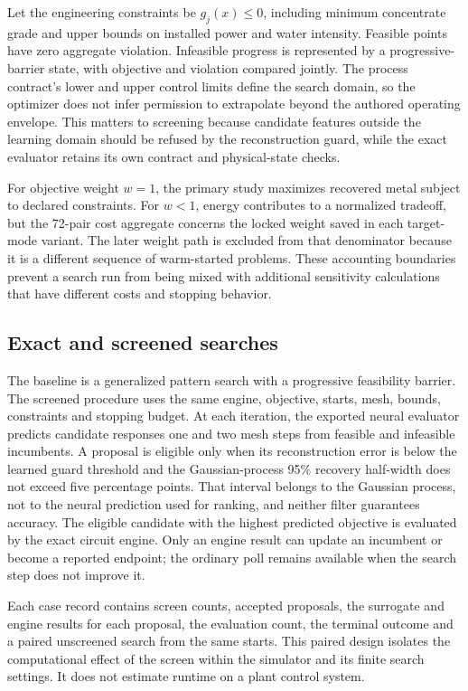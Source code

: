 \documentclass[10pt]{article}
\begin{document}
Let the engineering constraints be $g_j(x)\leq 0$, including minimum concentrate grade and upper bounds on installed power and water intensity. Feasible points have zero aggregate violation. Infeasible progress is represented by a progressive-barrier state, with objective and violation compared jointly. The process contract's lower and upper control limits define the search domain, so the optimizer does not infer permission to extrapolate beyond the authored operating envelope. This matters to screening because candidate features outside the learning domain should be refused by the reconstruction guard, while the exact evaluator retains its own contract and physical-state checks.

For objective weight $w=1$, the primary study maximizes recovered metal subject to declared constraints. For $w<1$, energy contributes to a normalized tradeoff, but the 72-pair cost aggregate concerns the locked weight saved in each target-mode variant. The later weight path is excluded from that denominator because it is a different sequence of warm-started problems. These accounting boundaries prevent a search run from being mixed with additional sensitivity calculations that have different costs and stopping behavior.

\subsection{Exact and screened searches}\label{proposed-screen-method}
The baseline is a generalized pattern search with a progressive feasibility barrier. The screened procedure uses the same engine, objective, starts, mesh, bounds, constraints and stopping budget. At each iteration, the exported neural evaluator predicts candidate responses one and two mesh steps from feasible and infeasible incumbents. A proposal is eligible only when its reconstruction error is below the learned guard threshold and the Gaussian-process 95\% recovery half-width does not exceed five percentage points. That interval belongs to the Gaussian process, not to the neural prediction used for ranking, and neither filter guarantees accuracy. The eligible candidate with the highest predicted objective is evaluated by the exact circuit engine. Only an engine result can update an incumbent or become a reported endpoint; the ordinary poll remains available when the search step does not improve it.

Each case record contains screen counts, accepted proposals, the surrogate and engine results for each proposal, the evaluation count, the terminal outcome and a paired unscreened search from the same starts. This paired design isolates the computational effect of the screen within the simulator and its finite search settings. It does not estimate runtime on a plant control system.
\end{document}
